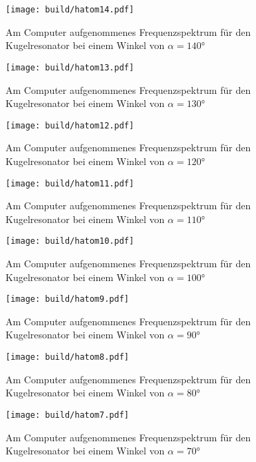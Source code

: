 \begin{figure}
  \centering
  \texttt{[image: build/hatom14.pdf]}
  \caption{Am Computer aufgenommenes Frequenzspektrum für den Kugelresonator bei
  einem Winkel von $\alpha=140°$}
  \label{fig:hatom14}
\end{figure}

\begin{figure}
  \centering
  \texttt{[image: build/hatom13.pdf]}
  \caption{Am Computer aufgenommenes Frequenzspektrum für den Kugelresonator bei
  einem Winkel von $\alpha=130°$}
  \label{fig:hatom13}
\end{figure}

\begin{figure}
  \centering
  \texttt{[image: build/hatom12.pdf]}
  \caption{Am Computer aufgenommenes Frequenzspektrum für den Kugelresonator bei
  einem Winkel von $\alpha=120°$}
  \label{fig:hatom12}
\end{figure}

\begin{figure}
  \centering
  \texttt{[image: build/hatom11.pdf]}
  \caption{Am Computer aufgenommenes Frequenzspektrum für den Kugelresonator bei
  einem Winkel von $\alpha=110°$}
  \label{fig:hatom11}
\end{figure}
\begin{figure}
  \centering
  \texttt{[image: build/hatom10.pdf]}
  \caption{Am Computer aufgenommenes Frequenzspektrum für den Kugelresonator bei
  einem Winkel von $\alpha=100°$}
  \label{fig:hatom10}
\end{figure}

\begin{figure}
  \centering
  \texttt{[image: build/hatom9.pdf]}
  \caption{Am Computer aufgenommenes Frequenzspektrum für den Kugelresonator bei
  einem Winkel von $\alpha=90°$}
  \label{fig:hatom9}
\end{figure}

\begin{figure}
  \centering
  \texttt{[image: build/hatom8.pdf]}
  \caption{Am Computer aufgenommenes Frequenzspektrum für den Kugelresonator bei
  einem Winkel von $\alpha=80°$}
  \label{fig:hatom8}
\end{figure}

\begin{figure}
  \centering
  \texttt{[image: build/hatom7.pdf]}
  \caption{Am Computer aufgenommenes Frequenzspektrum für den Kugelresonator bei
  einem Winkel von $\alpha=70°$}
  \label{fig:hatom7}
\end{figure}

